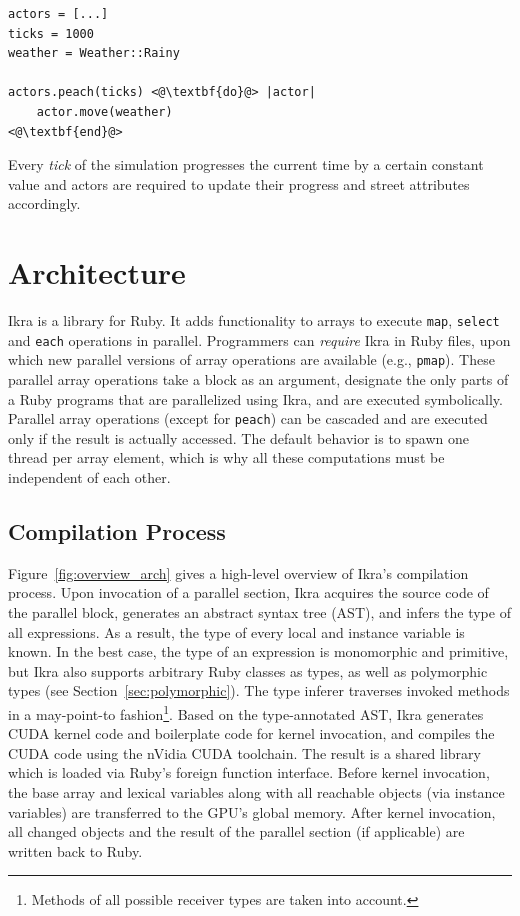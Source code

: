 \documentclass[preprint]{sigplanconf}
\begin{document}
\begin{lstlisting}
actors = [...]
ticks = 1000
weather = Weather::Rainy

actors.peach(ticks) <@\textbf{do}@> |actor|
    actor.move(weather)
<@\textbf{end}@>
\end{lstlisting}

Every \emph{tick} of the simulation progresses the current time by a certain constant value and actors are required to update their progress and street attributes accordingly.

\section{Architecture}
Ikra is a library for Ruby. It adds functionality to arrays to execute \texttt{map}, \texttt{select} and \texttt{each} operations in parallel. Programmers can \emph{require} Ikra in Ruby files, upon which new parallel versions of array operations are available (e.g., \texttt{pmap}). These parallel array operations take a block as an argument, designate the only parts of a Ruby programs that are parallelized using Ikra, and are executed symbolically. Parallel array operations (except for \texttt{peach}) can be cascaded and are executed only if the result is actually accessed. The default behavior is to spawn one thread per array element, which is why all these computations must be independent of each other. 

\subsection{Compilation Process}
Figure~\ref{fig:overview_arch} gives a high-level overview of Ikra's compilation process. Upon invocation of a parallel section, Ikra acquires the source code of the parallel block, generates an abstract syntax tree (AST), and infers the type of all expressions. As a result, the type of every local and instance variable is known. In the best case, the type of an expression is monomorphic and primitive, but Ikra also supports arbitrary Ruby classes as types, as well as polymorphic types (see Section~\ref{sec:polymorphic}). The type inferer traverses invoked methods in a may-point-to fashion\footnote{Methods of all possible receiver types are taken into account.}. Based on the type-annotated AST, Ikra generates CUDA kernel code and boilerplate code for kernel invocation, and compiles the CUDA code using the nVidia CUDA toolchain. The result is a shared library which is loaded via Ruby's foreign function interface. Before kernel invocation, the base array and lexical variables along with all reachable objects (via instance variables) are transferred to the GPU's global memory. After kernel invocation, all changed objects and the result of the parallel section (if applicable) are written back to Ruby.
\end{document}
